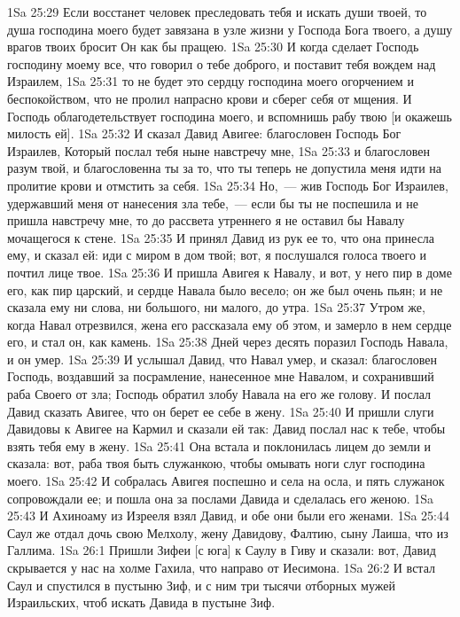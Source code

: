 \vs 1Sa 25:29 Если восстанет человек преследовать тебя и искать души твоей, то душа господина моего будет завязана в узле жизни у Господа Бога твоего, а душу врагов твоих бросит Он как бы пращею.
\vs 1Sa 25:30 И когда сделает Господь господину моему все, что говорил о тебе доброго, и поставит тебя вождем над Израилем,
\vs 1Sa 25:31 то не будет это сердцу господина моего огорчением и беспокойством, что не пролил напрасно крови и сберег себя от мщения. И Господь облагодетельствует господина моего, и вспомнишь рабу твою [и окажешь милость ей].
\vs 1Sa 25:32 И сказал Давид Авигее: благословен Господь Бог Израилев, Который послал тебя ныне навстречу мне,
\vs 1Sa 25:33 и благословен разум твой, и благословенна ты за то, что ты теперь не допустила меня идти на пролитие крови и отмстить за себя.
\vs 1Sa 25:34 Но,~--- жив Господь Бог Израилев, удержавший меня от нанесения зла тебе,~--- если бы ты не поспешила и не пришла навстречу мне, то до рассвета утреннего я не оставил бы Навалу мочащегося к стене.
\vs 1Sa 25:35 И принял Давид из рук ее то, что она принесла ему, и сказал ей: иди с миром в дом твой; вот, я послушался голоса твоего и почтил лице твое.
\vs 1Sa 25:36 И пришла Авигея к Навалу, и вот, у него пир в доме его, как пир царский, и сердце Навала было весело; он же был очень пьян; и не сказала ему ни слова, ни большого, ни малого, до утра.
\vs 1Sa 25:37 Утром же, когда Навал отрезвился, жена его рассказала ему об этом, и замерло в нем сердце его, и стал он, как камень.
\vs 1Sa 25:38 Дней через десять поразил Господь Навала, и он умер.
\vs 1Sa 25:39 И услышал Давид, что Навал умер, и сказал: благословен Господь, воздавший за посрамление, нанесенное мне Навалом, и сохранивший раба Своего от зла; Господь обратил злобу Навала на его же голову. И послал Давид сказать Авигее, что он берет ее себе в жену.
\vs 1Sa 25:40 И пришли слуги Давидовы к Авигее на Кармил и сказали ей так: Давид послал нас к тебе, чтобы взять тебя ему в жену.
\vs 1Sa 25:41 Она встала и поклонилась лицем до земли и сказала: вот, раба твоя  быть служанкою, чтобы омывать ноги слуг господина моего.
\vs 1Sa 25:42 И собралась Авигея поспешно и села на осла, и пять служанок сопровождали ее; и пошла она за послами Давида и сделалась его женою.
\vs 1Sa 25:43 И Ахиноаму из Изрееля взял Давид, и обе они были его женами.
\vs 1Sa 25:44 Саул же отдал дочь свою Мелхолу, жену Давидову, Фалтию, сыну Лаиша, что из Галлима.
\vs 1Sa 26:1 Пришли Зифеи [с юга] к Саулу в Гиву и сказали: вот, Давид скрывается у нас на холме Гахила, что направо от Иесимона.
\vs 1Sa 26:2 И встал Саул и спустился в пустыню Зиф, и с ним три тысячи отборных мужей Израильских, чтоб искать Давида в пустыне Зиф.
